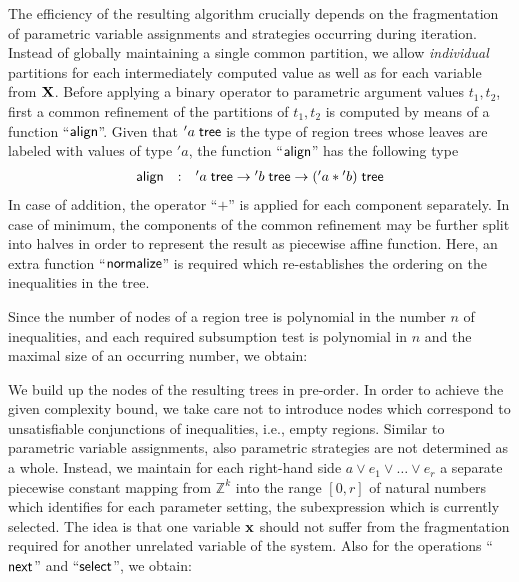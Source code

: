 \documentclass[a4paper]{easychair}
\renewcommand{\qed}{\hfill\mbox{\rule[0pt]{1.3ex}{1.3ex}}}
\newcommand{\ZZ}{\mathbb{Z}}
\begin{document}
The efficiency of the resulting algorithm  crucially depends on the fragmentation of parametric variable assignments and
strategies occurring during iteration. 
Instead of globally maintaining a single common partition,
we allow \emph{individual} partitions for each intermediately computed value
as well as for each variable from $\bf X$.
Before applying a binary operator to parametric argument values $t_1,t_2$,
first a common refinement of the partitions of $t_1,t_2$ is computed by means of
a function ``${\sf align}$''. 
Given that 
${'}a\;{\sf tree}$ is the type of region trees whose leaves are labeled with values of type ${'}a$,
the function ``${\sf align}$'' has the following type
\[
\begin{array}{lll}
{\sf align}	&:&	{'}a\;{\sf tree}\to {'}b\;{\sf tree}\to({'}a*{'}b)\;{\sf tree}
\end{array}
\]
In case of addition,
the operator ``$+$'' is applied for each component separately. 
In case of minimum,
the components of the common refinement may be further split into halves 
in order to represent the result as piecewise affine function.
Here, an extra function ``${\sf normalize}$'' is required which re-establishes
the ordering on the inequalities in the tree.


Since the number of nodes of a region tree is polynomial in the number $n$ of inequalities, 
and each required subsumption test is polynomial in $n$ and the maximal size of an occurring number,
we obtain:


\noindent
We build up the nodes of the resulting trees in pre-order.
In order to achieve the given complexity bound, we take care not to introduce nodes which correspond to 
unsatisfiable conjunctions of inequalities, i.e., empty regions. 
Similar to parametric variable assignments, also parametric strategies are not determined as a whole. 
Instead, we maintain for 
each right-hand side $a\vee e_1\vee \ldots\vee e_r$ 
a separate piecewise constant mapping from $\ZZ^k$ into the
range $[0,r]$ of natural numbers which identifies for each parameter setting, the subexpression which is currently selected.
The idea is that one variable ${\bf x}$ should not suffer from the fragmentation
required for another unrelated variable of the system.
Also for the operations ``${\sf next}$'' and ``${\sf select}$'', we obtain:
\end{document}
